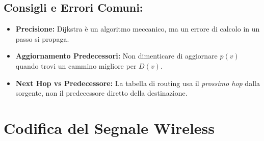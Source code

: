 \subsection{Consigli e Errori Comuni:}
\begin{itemize}
    \item \textbf{Precisione:} Dijkstra è un algoritmo meccanico, ma un errore di calcolo in un passo si propaga.
    \item \textbf{Aggiornamento Predecessori:} Non dimenticare di aggiornare $p(v)$ quando trovi un cammino migliore per $D(v)$.
    \item \textbf{Next Hop vs Predecessore:} La tabella di routing usa il \textit{prossimo hop} dalla sorgente, non il predecessore diretto della destinazione.
\end{itemize}

\section{Codifica del Segnale Wireless}

